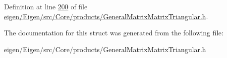 Definition at line \hyperlink{eigen_2_eigen_2src_2_core_2products_2_general_matrix_matrix_triangular_8h_source_l00200}{200} of file \hyperlink{eigen_2_eigen_2src_2_core_2products_2_general_matrix_matrix_triangular_8h_source}{eigen/\+Eigen/src/\+Core/products/\+General\+Matrix\+Matrix\+Triangular.\+h}.



The documentation for this struct was generated from the following file\+:\begin{DoxyCompactItemize}
\item 
eigen/\+Eigen/src/\+Core/products/\+General\+Matrix\+Matrix\+Triangular.\+h\end{DoxyCompactItemize}
